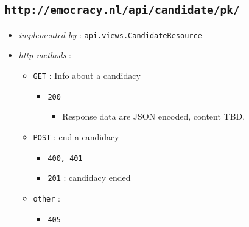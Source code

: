\documentclass[a4paper]{report}
\begin{document}
\subsection{\texttt{http://emocracy.nl/api/candidate/\textsf{pk}/}}
\begin{itemize}
    \item{\textsl{implemented by} : \texttt{api.views.CandidateResource}}
    \item{\textsl{http methods} :
        \begin{itemize}
            \item{\texttt{GET} :  Info about a candidacy
                \begin{itemize}
                    \item{\texttt{200}
                    \begin{itemize}
                        \item{Response data are JSON encoded, content TBD.}
                    \end{itemize}
                    }
                \end{itemize}
            }
            \item{\texttt{POST} : end a candidacy
                \begin{itemize}
                    \item{\texttt{400, 401}}
                    \item{\texttt{201} : candidacy ended}
                \end{itemize}
            }
            
            \item{\texttt{other} :
                \begin{itemize}
                    \item{\texttt{405}}
                \end{itemize}
            }
        \end{itemize}
    }
\end{itemize}
\end{document}
